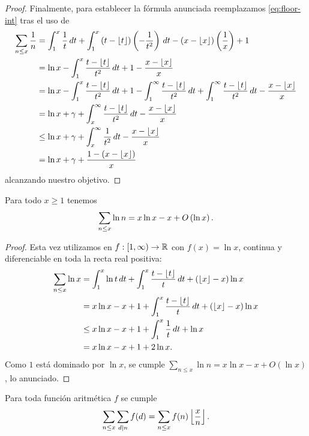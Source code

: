 \begin{proof}
  Finalmente, para establecer la f\'ormula anunciada
  reemplazamos \eqref{eq:floor-int} tras el uso de 
  \begin{align*}
    \sum_{n \leq x} \frac{1}{n} &= \int_1^x \frac{1}{t} \, dt +
    \int_1^x \left( t - \left\lfloor t \right\rfloor \right) \left( -\frac{1}{t^2} \right) \, dt
    - \left( x - \left\lfloor x \right\rfloor \right) \left( \frac{1}{x} \right) + 1 \\
    &= \ln x - \int_1^x \frac{t - \left\lfloor t \right\rfloor}{t^2} \, dt + 1 - \frac{x - \left\lfloor x \right\rfloor}{x} \\
    &= \ln x - \int_1^x \frac{t - \left\lfloor t \right\rfloor}{t^2} \, dt
    + 1 - \int_1^{\infty} \frac{t - \left\lfloor t \right\rfloor}{t^2} \, dt +
    \int_1^{\infty} \frac{t - \left\lfloor t \right\rfloor}{t^2} \, dt
    - \frac{x - \left\lfloor x \right\rfloor}{x} \\
    &= \ln x + \gamma + \int_x^{\infty} \frac{t - \left\lfloor t \right\rfloor}{t^2} \, dt
    - \frac{x - \left\lfloor x \right\rfloor}{x} \\
    &\leq \ln x + \gamma + \int_x^{\infty} \frac{1}{t^2} \, dt - \frac{x - \left\lfloor x \right\rfloor}{x} \\
    &= \ln x + \gamma + \frac{1 - \left( x - \left\lfloor x \right\rfloor \right)}{x}
  \end{align*}
  alcanzando nuestro objetivo.
\end{proof}

\begin{lemma}
  \label{lem:sum-ln}
  Para todo \(x \geq 1\) tenemos
  \[
    \sum_{n \leq x} \ln n = x\ln x - x + O\left( \ln x \right).
  \]
\end{lemma}

\begin{proof}
  Esta vez utilizamos  en
  \(f : [1, \infty) \to \mathbb{R}\) con \(f(x) = \ln x\),
  continua y diferenciable en toda la recta real positiva:  
  \begin{align*}
    \sum_{n \leq x} \ln x &= \int_1^x \ln t \, dt +
    \int_1^x  \frac{t - \left\lfloor t \right\rfloor}{t} \, dt + \left( \left\lfloor x \right\rfloor - x \right) \ln x  \\
    &= x \ln x - x + 1 + \int_1^x \frac{t - \left\lfloor t \right\rfloor}{t} \, dt
    + \left( \left\lfloor x \right\rfloor - x \right) \ln x \\
    &\leq x \ln x - x + 1 + \int_1^x \frac{1}{t} \,dt + \ln x \\
    &= x \ln x - x + 1 + 2 \ln x.
  \end{align*}
  Como \(1\) est\'a dominado por \(\ln x\),
  se cumple \(\sum_{n \leq x} \ln n = x\ln x - x + O(\ln x)\), 
  lo anunciado.
\end{proof}

\begin{lemma}
  \label{lem:sum-sum-f}
  Para toda funci\'on aritm\'etica \(f\) se cumple
  \[
    \sum_{n \leq x} \sum_{d \mid n} f(d) =
    \sum_{n \leq x} f(n) \left\lfloor \frac{x}{n} \right\rfloor.
  \]
\end{lemma}


